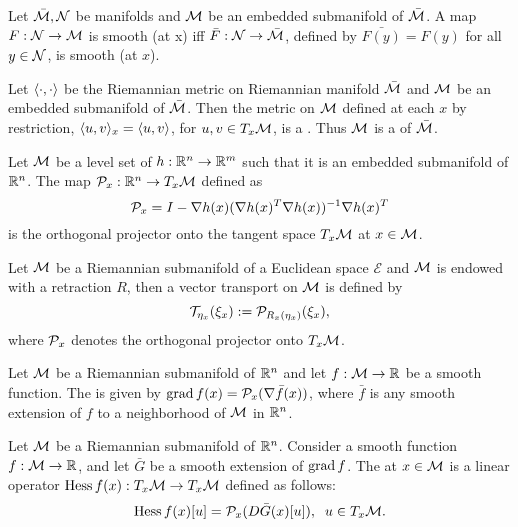 \documentclass[11pt,a4paper]{article}
\begin{document}
\begin{proposition}
Let $\bar{\mathcal{M}}, \mathcal{N}$ be manifolds and $\mathcal{M}$ be an embedded submanifold of $\bar{\mathcal{M}}$. A map $F:\mathcal{N}\rightarrow \mathcal{M}$ is smooth (at x) iff $\bar{F}:\mathcal{N}\rightarrow \bar{\mathcal{M}}$, defined by $\bar{F(y)} = F(y)$ for all $y\in \mathcal{N}$, is smooth (at $x$).
\end{proposition}

\begin{proposition}
Let $\langle \cdot, \cdot \rangle$ be the Riemannian metric on Riemannian manifold $\bar{\mathcal{M}}$ and $\mathcal{M}$ be an embedded submanifold of $\bar{\mathcal{M}}$. Then the metric on $\mathcal{M}$ defined at each $x$ by restriction, $\langle u, v \rangle_x = \langle u, v \rangle$, for $u, v \in T_x\mathcal{M}$, is a . Thus $\mathcal{M}$ is a  of $\bar{\mathcal{M}}$.
\end{proposition}

\begin{proposition}
Let $\mathcal{M}$ be a level set of $h:\mathbb{R}^n\rightarrow \mathbb{R}^m$ such that it is an embedded submanifold of $\mathbb{R}^n$. The map $\mathcal{P}_x:\mathbb{R}^n\rightarrow T_x\mathcal{M}$ defined as 
\begin{equation*}
\mathcal{P}_x = I - \nabla h(x)(\nabla h(x)^T\nabla h(x))^{-1}\nabla h(x)^T    
\end{equation*}
is the orthogonal projector onto the tangent space $T_x\mathcal{M}$ at $x\in \mathcal{M}$.
\end{proposition}

\begin{proposition}
Let $\mathcal{M}$ be a Riemannian submanifold of a Euclidean space $\mathcal{E}$ and $\mathcal{M}$ is endowed with a retraction $R$, then a vector transport on $\mathcal{M}$ is defined by 
\begin{equation}
\mathcal{T}_{\eta_x}(\xi_x) := \mathcal{P}_{R_x(\eta_x)}(\xi_x),
\end{equation}
where $\mathcal{P}_x$ denotes the orthogonal projector onto $T_x\mathcal{M}$.
\end{proposition}

\begin{proposition}
Let $\mathcal{M}$ be a Riemannian submanifold of $\mathbb{R}^n$ and let $f:\mathcal{M}\rightarrow \mathbb{R}$ be a smooth function. The  is given by $\text{grad}\, f(x) = \mathcal{P}_x(\nabla \bar{f}(x))$, where $\bar{f}$ is any smooth extension of $f$ to a neighborhood of $\mathcal{M}$ in $\mathbb{R}^n$.
\end{proposition}

\begin{proposition}
Let $\mathcal{M}$ be a Riemannian submanifold of $\mathbb{R}^n$. Consider a smooth function $f:\mathcal{M}\rightarrow \mathbb{R}$, and let $\bar{G}$ be a smooth extension of $\text{grad}\, f$. The  at $x \in\mathcal{M}$ is a linear operator $\text{Hess}\, f(x):T_x\mathcal{M}\rightarrow T_x\mathcal{M}$ defined as follows:
\begin{equation*}
\text{Hess}\, f(x)[u] = \mathcal{P}_x(D\bar{G}(x)[u]), \;\;u\in T_x\mathcal{M}.
\end{equation*}
\end{proposition}
\end{document}
